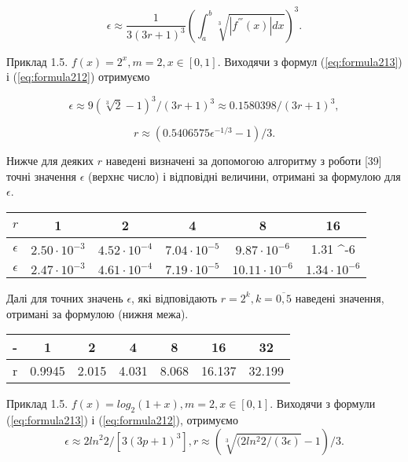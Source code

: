\documentclass[ukrainian,14pt]{extarticle}
\begin{document}
\begin{equation}\label{eq:formula213}
    \epsilon \approx \frac{1}{3(3r + 1)^3} \left( \int_a^b \sqrt[3]{|f^{'''}(x)| dx} \right)^3.
\end{equation}

Приклад 1.5. $f(x) = 2^x, m = 2, x \in [0,1].$ Виходячи з формул (\ref{eq:formula213}) і (\ref{eq:formula212}) отримуємо

$$\epsilon \approx 9(\sqrt[3]{2} - 1)^3 / (3r + 1)^3 \approx 0.1580398 / (3r + 1)^3,$$

$$r \approx (0.5406575 \epsilon^{-1/3} - 1) / 3.$$

Нижче для деяких $r$ наведені визначені за допомогою алгоритму з роботи [39] точні значення $\epsilon$ (верхнє число) і відповідні величини, отримані за формулою для $\epsilon$.

\bgroup
\def\arraystretch{1.5}
\begin{center}
\begin{tabular}{ c | c |
c | c | c | c}
 $r$ & 1 & 2 & 4 & 8 & 16 \\
 \hline
 $\epsilon$ & $2.50 \cdot 10^{-3}$ & $4.52 \cdot 10^{-4}$ & $7.04 \cdot 10^{-5}$ & $9.87 \cdot 10^{-6}$ & 1.31 \cdot 10^{-6} \\  
 \hline
  $\epsilon$ & $2.47 \cdot 10^{-3}$ & $4.61 \cdot 10^{-4}$ & $7.19 \cdot 10^{-5}$ & $10.11 \cdot 10^{-6}$ & $1.34 \cdot 10^{-6}$ \\  
\end{tabular}
\end{center}
\egroup

Далі для точних значень $\epsilon$, які відповідають $r = 2^k, k = \overline{0, 5}$ наведені значення, отримані за формулою (нижня межа).

\bgroup
\def\arraystretch{1.5}
\begin{center}
\begin{tabular}{ c | c |
c | c | c | c | c}
 - & 1 & 2 & 4 & 8 & 16 & 32 \\
 \hline
 r & 0.9945 & 2.015 & 4.031 & 8.068 & 16.137 & 32.199 \\  

\end{tabular}
\end{center}
\egroup

Приклад 1.5. $f(x) = log_2 (1+x), m = 2, x \in [0, 1].$ Виходячи з формули  (\ref{eq:formula213}) і (\ref{eq:formula212}), отримуємо
    $$\epsilon \approx 2 ln^2 2/[3(3p + 1)^3], r \approx (\sqrt[3]{(2 ln^2 2/ (3\epsilon)} - 1) /3.$$
    
\end{document}
